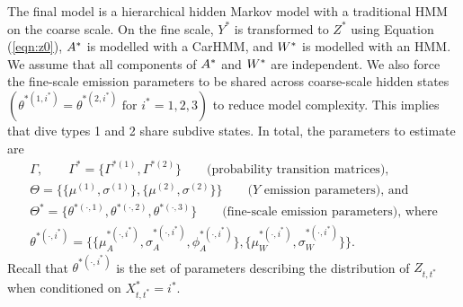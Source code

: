 The final model is a hierarchical hidden Markov model with a traditional HMM on the coarse scale. On the fine scale, $Y^*$ is transformed to $Z^*$ using Equation (\ref{eqn:z0}), $A^*$ is modelled with a CarHMM, and $W^*$ is modelled with an HMM. We assume that all components of $A^*$ and $W^*$ are independent. We also force the fine-scale emission parameters to be shared across coarse-scale hidden states $\left(\theta^{*(1,i^*)} = \theta^{*(2,i^*)} \text{ for } i^* = 1,2,3\right)$ to reduce model complexity. This implies that dive types 1 and 2 share subdive states. In total, the parameters to estimate are
%
\begin{gather*}
    \Gamma, \qquad \Gamma^{*} = \{\Gamma^{*(1)},\Gamma^{*(2)}\} \qquad \text{(probability transition matrices)}, \\
    \Theta = \{\{\mu^{(1)},\sigma^{(1)}\},\{\mu^{(2)},\sigma^{(2)}\}\} \qquad \text{($Y$ emission parameters), and} \\
    \Theta^* = \{\theta^{*(\cdot,1)},\theta^{*(\cdot,2)},\theta^{*(\cdot,3)}\}  \qquad \text{(fine-scale emission parameters), where} \\
    \theta^{*(\cdot,i^*)} =  \{\{\mu_A^{*(\cdot,i^*)},\sigma_A^{*(\cdot,i^*)},\phi_A^{*(\cdot,i^*)}\},\{\mu_W^{*(\cdot,i^*)},\sigma_W^{*(\cdot,i^*)}\}\}.
\end{gather*}
%
Recall that $\theta^{*(\cdot,i^*)}$ is the set of parameters describing the distribution of $Z_{t,t^*}$ when conditioned on $X^*_{t,t^*} = i^*$. 

